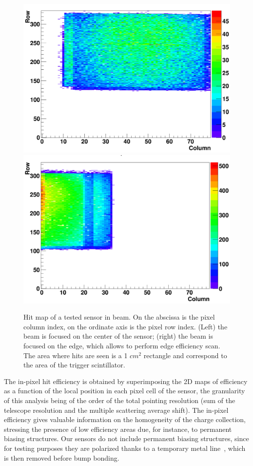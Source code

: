 \begin{figure}[htbp]
\centering %
\includegraphics[width=.45\textwidth,origin=c,angle=0]{hitmap_center.png}
\qquad
\includegraphics[width=.45\textwidth,origin=c,angle=0]{hitmap_edge.png}
\caption{\label{fig:hitmap} Hit map of a tested sensor in beam. On the abscissa is the pixel column index, on the ordinate axis is the pixel row index. (Left) the beam is focused on the center of the sensor; (right) the beam  is focused on the edge, which allows to perform edge efficiency scan. The area where hits are seen is a 1 $ cm^2$ rectangle and correspond to the area of the trigger scintillator.}
\end{figure}

The in-pixel hit efficiency is obtained by superimposing the 2D maps of efficiency as a function of the local position in each pixel cell of the sensor, the granularity of this analysis being of the order of the total pointing resolution (sum of the telescope resolution and the multiple scattering average shift). The in-pixel efficiency gives valuable information on the homogeneity of the charge collection, stressing the presence of low efficiency areas due, for instance, to permanent biasing structures. Our sensors do not include permanent biasing structures, since for testing purposes they are polarized thanks to a temporary metal line~\cite{bib:metal}, which is then removed before bump bonding.

